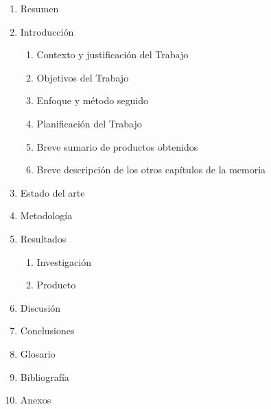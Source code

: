 \begin{enumerate}

    \item Resumen
    \item Introducción
    \begin{enumerate}
        \item Contexto y justificación del Trabajo
        \item Objetivos del Trabajo
        \item Enfoque y método seguido
        \item Planificación del Trabajo
        \item Breve sumario de productos obtenidos
        \item Breve descripción de los otros capítulos de la memoria
    \end{enumerate}
    \item Estado del arte
    \item Metodología
    \item Resultados
    \begin{enumerate}
        \item Investigación
        \item Producto
    \end{enumerate}
    \item Discusión
    \item Conclusiones
    \item Glosario
    \item Bibliografía
    \item Anexos

\end{enumerate}


